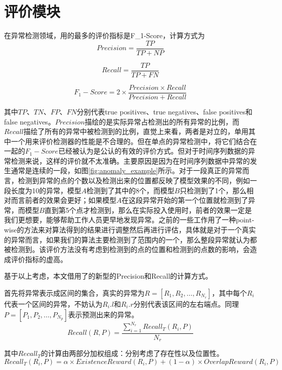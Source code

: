 \section{评价模块}
在异常检测领域，用的最多的评价指标是F\_1-Score，计算方式为
\begin{equation*}
  Precision = \frac{TP}{TP + NP}
\end{equation*}

\begin{equation*}
  Recall = \frac{TP}{TP + FN}
\end{equation*}

\begin{equation*}
  F_1-Score = 2\times \frac { Precision \times Recall}{Precision + Recall}
\end{equation*}

其中$TP$、$TN$、$FP$、$FN$分别代表true positives、true negatives、false positives和 false negatives。$Precision$描绘的是实际异常占检测出的所有异常的比例，而$Recall$描绘了所有的异常中被检测到的比例，直觉上来看，两者是对立的，单用其中一个用来评价检测器的性能是不合理的。但在单点的异常检测中，将它们结合在一起的$F_1-Score$已经被认为是公认的有效的评价方式。但对于时间序列数据的异常检测来说，这样的评价就不太准确。主要原因是因为在时间序列数据中异常的发生通常是连续的一段，如图\ref{fig:anomaly_example}所示。对于一段真正的异常而言，检测到异常的点的个数以及检测出来的位置都反映了模型效果的不同，例如一段长度为10的异常，模型$A$检测到了其中的8个，而模型$B$只检测到了1个，那么相对而言前者的效果会更好；如果模型$A$在这段异常开始的第一个位置就检测到了异常，而模型$B$直到第5个点才检测到，那么在实际投入使用时，前者的效果一定是我们更想要，能够帮助工作人员更早地发现异常。之前的一些工作\cite{xu2018unsupervised}\cite{su2019robust}用了一种point-wise的方法来对算法得到的结果进行调整然后再进行评估，具体就是对于一个真实的异常而言，如果我们的算法主要检测到了范围内的一个，那么整段异常就认为都被检测到。该评价方法没有考虑到检测到的点的位置和检测到的点数的影响，会造成评价指标的虚高。

基于以上考虑，本文借用了\cite{tatbul2018precision}的新型的Precision和Recall的计算方式。

首先将异常表示成区间的集合，真实的异常为$R=[R_1,R_2,\dots,R_{N_r}]$，其中每个$R_i$代表一个区间的异常，不妨认为$R_i.l$和$R_i.r$分别代表该区间的左右端点。同理$P=[P_1,P_2,\dots,P_{N_p}]$表示预测出来的异常。
\begin{equation*}
  Recall(R,P) = \frac{\sum_{i=1}^{N_r} Recall_T(R_i,P)}{N_r}
\end{equation*}

其中$Recall_T$的计算由两部分加权组成：分别考虑了存在性以及位置性。
\begin{equation*}
  Recall_T(R_i,P) = \alpha \times ExistenceReward(R_i,P) + (1-\alpha) \times OverlapReward (R_i,P)
\end{equation*}

